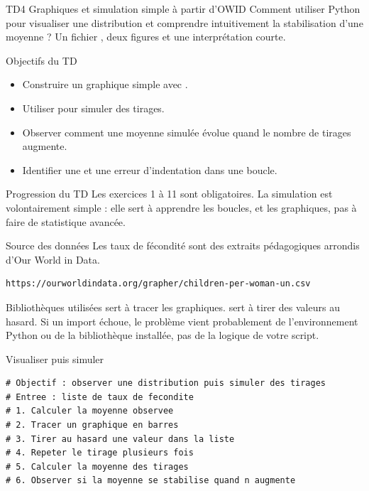 \documentclass[11pt,a4paper]{article}
\begin{document}
\workbooktitle
  {TD4}
  {Graphiques et simulation simple à partir d'OWID}
  {Comment utiliser Python pour visualiser une distribution et comprendre intuitivement la stabilisation d'une moyenne ?}
  {Un fichier , deux figures  et une interprétation courte.}

\begin{objectivebox}{Objectifs du TD}
\begin{itemize}
  \item Construire un graphique simple avec .
  \item Utiliser  pour simuler des tirages.
  \item Observer comment une moyenne simulée évolue quand le nombre de tirages augmente.
  \item Identifier une  et une erreur d'indentation dans une boucle.
\end{itemize}
\end{objectivebox}

\begin{checkpointbox}{Progression du TD}
Les exercices 1 à 11 sont obligatoires. La simulation est volontairement simple : elle sert à apprendre les boucles,  et les graphiques, pas à faire de statistique avancée.
\end{checkpointbox}

\begin{checkpointbox}{Source des données}
Les taux de fécondité sont des extraits pédagogiques arrondis d'Our World in Data.
\begin{lstlisting}[language=terminal]
https://ourworldindata.org/grapher/children-per-woman-un.csv
\end{lstlisting}
\end{checkpointbox}

\begin{pathwaybox}{Bibliothèques utilisées}
 sert à tracer les graphiques.  sert à tirer des valeurs au hasard. Si un import échoue, le problème vient probablement de l'environnement Python ou de la bibliothèque installée, pas de la logique de votre script.
\end{pathwaybox}

\begin{pseudocodeexercise}{Visualiser puis simuler}
\begin{lstlisting}
# Objectif : observer une distribution puis simuler des tirages
# Entree : liste de taux de fecondite
# 1. Calculer la moyenne observee
# 2. Tracer un graphique en barres
# 3. Tirer au hasard une valeur dans la liste
# 4. Repeter le tirage plusieurs fois
# 5. Calculer la moyenne des tirages
# 6. Observer si la moyenne se stabilise quand n augmente
\end{lstlisting}
\end{pseudocodeexercise}
\end{document}
